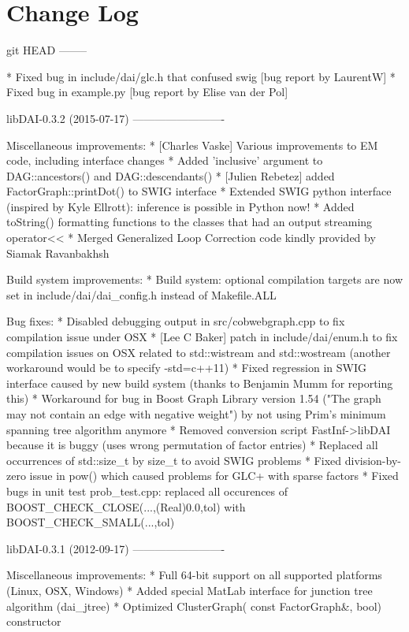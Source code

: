 \chapter{Change Log}
\hypertarget{changelog}{}\label{changelog}

\begin{DoxyVerbInclude}
git HEAD
--------

* Fixed bug in include/dai/glc.h that confused swig [bug report by LaurentW]
* Fixed bug in example.py [bug report by Elise van der Pol]


libDAI-0.3.2 (2015-07-17)
-------------------------

Miscellaneous improvements:
* [Charles Vaske] Various improvements to EM code, including interface changes
* Added 'inclusive' argument to DAG::ancestors() and DAG::descendants()
* [Julien Rebetez] added FactorGraph::printDot() to SWIG interface
* Extended SWIG python interface (inspired by Kyle Ellrott): inference is possible in Python now!
* Added toString() formatting functions to the classes that had an output streaming operator<<
* Merged Generalized Loop Correction code kindly provided by Siamak Ravanbakhsh

Build system improvements:
* Build system: optional compilation targets are now set in include/dai/dai_config.h instead of Makefile.ALL

Bug fixes:
* Disabled debugging output in src/cobwebgraph.cpp to fix compilation issue under OSX
* [Lee C Baker] patch in include/dai/enum.h to fix compilation issues on OSX related to std::wistream and std::wostream (another workaround would be to specify -std=c++11)
* Fixed regression in SWIG interface caused by new build system (thanks to Benjamin Mumm for reporting this)
* Workaround for bug in Boost Graph Library version 1.54 ("The graph may not contain an edge with negative weight") by not using Prim's minimum spanning tree algorithm anymore
* Removed conversion script FastInf->libDAI because it is buggy (uses wrong permutation of factor entries)
* Replaced all occurrences of std::size_t by size_t to avoid SWIG problems
* Fixed division-by-zero issue in pow() which caused problems for GLC+ with sparse factors
* Fixed bugs in unit test prob_test.cpp: replaced all occurences of
  BOOST_CHECK_CLOSE(...,(Real)0.0,tol) with BOOST_CHECK_SMALL(...,tol)


libDAI-0.3.1 (2012-09-17)
-------------------------

Miscellaneous improvements:
* Full 64-bit support on all supported platforms (Linux, OSX, Windows)
* Added special MatLab interface for junction tree algorithm (dai_jtree)
* Optimized ClusterGraph( const FactorGraph&, bool) constructor


\end{DoxyVerbInclude}

